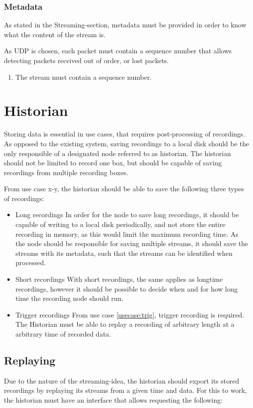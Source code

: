 \subsubsection{Metadata}
As stated in the Streaming-section, metadata must be provided in order to know what the content of the stream is.

As UDP is chosen, each packet must contain a sequence number that allows detecting packets received out of order, or lost packets.

\begin{enumerate}
	\item The stream must contain a sequence number.
\end{enumerate}

\section{Historian}
Storing data is essential in use cases, that requires post-processing of recordings. As opposed to the existing system, saving recordings to a local disk should be the only responsible of a designated node referred to as historian.
The historian should not be limited to record one box, but should be capable of saving recordings from multiple recording boxes.

From use case x-y, the historian should be able to save the following three types of recordings:
\begin{itemize}
	\item Long recordings
		In order for the node to save long recordings, it should be capable of writing 			to a local disk periodically, and not store the entire recording in memory, 			as this would limit the maximum recording time. As the node should be responsible for 				saving multiple streams, it should save the streams with its metadata, such that the streams can be identified when processed.
	\item Short recordings
		With short recordings, the same applies as longtime recordings, however it 				should be possible to decide when and for how long time the recording node should 			run.
	\item Trigger recordings
		From use case \ref{usecase:trig}, trigger recording is required. The Historian must be able to replay a recording of arbitrary length at a arbitrary time of recorded data.
\end{itemize}


\subsection{Replaying}
Due to the nature of the streaming-idea, the historian should export its stored recordings by replaying its streams from a given time and data. For this to work, the historian must have an interface that allows requesting the following:

